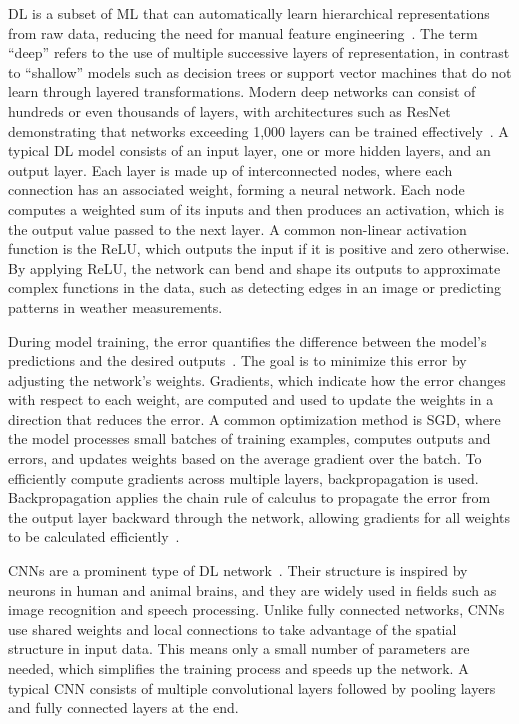 \documentclass[
english,                 %
bibtex,                  %
]{kththesis}
\numberwithin{listing}{chapter}
\begin{document}
\Gls{DL} is a subset of \gls{ML} that can automatically learn hierarchical representations from raw data, reducing the need for manual feature engineering~\cite{lecun_deep_2015}. The term ``deep'' refers to the use of multiple successive layers of representation, in contrast to ``shallow'' models such as decision trees or support vector machines that do not learn through layered transformations. Modern deep networks can consist of hundreds or even thousands of layers, with architectures such as ResNet demonstrating that networks exceeding 1,000 layers can be trained effectively~\cite{he_identity_2016}. A typical \gls{DL} model consists of an input layer, one or more hidden layers, and an output layer. Each layer is made up of interconnected nodes, where each connection has an associated weight, forming a neural network. Each node computes a weighted sum of its inputs and then produces an activation, which is the output value passed to the next layer. A common non-linear activation function is the \gls{ReLU}, which outputs the input if it is positive and zero otherwise. By applying \gls{ReLU}, the network can bend and shape its outputs to approximate complex functions in the data, such as detecting edges in an image or predicting patterns in weather measurements.

During model training, the error quantifies the difference between the model's predictions and the desired outputs~\cite{schmidhuber_deep_2015}. The goal is to minimize this error by adjusting the network's weights. Gradients, which indicate how the error changes with respect to each weight, are computed and used to update the weights in a direction that reduces the error. A common optimization method is \gls{SGD}, where the model processes small batches of training examples, computes outputs and errors, and updates weights based on the average gradient over the batch. To efficiently compute gradients across multiple layers, backpropagation is used. Backpropagation applies the chain rule of calculus to propagate the error from the output layer backward through the network, allowing gradients for all weights to be calculated efficiently~\cite{rumelhart_learning_1986}.

\Glspl{CNN} are a prominent type of \gls{DL} network~\cite{alzubaidi_review_2021}. Their structure is inspired by neurons in human and animal brains, and they are widely used in fields such as image recognition and speech processing. Unlike fully connected networks, \glspl{CNN} use shared weights and local connections to take advantage of the spatial structure in input data. This means only a small number of parameters are needed, which simplifies the training process and speeds up the network. A typical \gls{CNN} consists of multiple convolutional layers followed by pooling layers and fully connected layers at the end.
\end{document}
